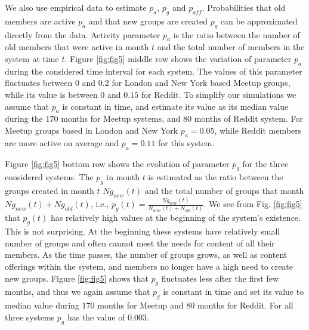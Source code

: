 We also use empirical data to estimate $p_{a}$, $p_{g}$ and $p_{aff}$. Probabilities that old members are active $p_a$ and that new groups are created $p_g$ can be approximated directly from the data. Activity parameter $p_{a}$ is the ratio between the number of old members that were active in month $t$ and the total number of members in the system at time $t$. Figure \ref{fig:fig5} middle row shows the variation of parameter $p_{a}$ during the considered time interval for each system. The values of this parameter fluctuates between $0$ and $0.2$ for London and New York based Meetup groups, while its value is between $0$ and $0.15$ for Reddit. To simplify our simulations we assume that $p_{a}$ is constant in time, and estimate its value as its median value during the $170$ months for Meetup systems, and $80$ months of Reddit system. For Meetup groups based in London and New York $p_{a}=0.05$, while Reddit members are more active on average and $p_{a}=0.11$ for this system.

Figure \ref{fig:fig5} bottom row shows the evolution of parameter $p_{g}$ for the three considered systems. The $p_{g}$ in month $t$ is estimated as the ratio between the groups created in month $t$ $Ng_{new}(t)$ and the total number of groups that month $Ng_{new}(t)+Ng_{old}(t)$, i.e., $p_{g}(t)=\frac{Ng_{new}(t)}{N_{new}(t)+N_{old}(t)}$. We see from Fig. \ref{fig:fig5} that $p_{g}(t)$ has relatively high values at the beginning of the system's existence. This is not surprising. At the beginning these systems have relatively small number of groups and often cannot meet the needs for content of all their members. As the time passes, the number of groups grows, as well as content offerings within the system, and members no longer have a high need to create new groups. Figure \ref{fig:fig5} shows that $p_{g}$ fluctuates less after the first few months, and thus we again assume that $p_{g}$ is constant in time and set its value to median value during 170 months for Meetup and 80 months for Reddit. For all three systems $p_{g}$ has the value of $0.003$.

